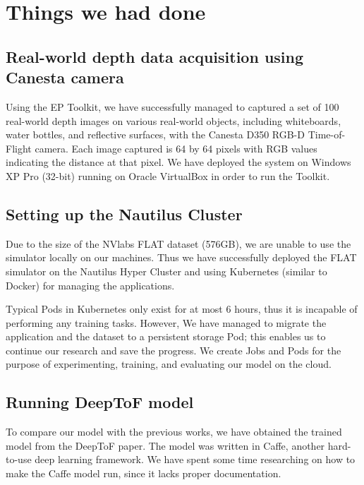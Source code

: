 \documentclass[runningheads]{llncs}
\begin{document}
\clearpage




\appendix
\appendixpage

\section{Things we had done}


\subsection{Real-world depth data acquisition using Canesta camera}

Using the EP Toolkit, we have successfully managed to captured a set of 100 real-world depth images on various real-world objects, including whiteboards, water bottles, and reflective surfaces, with the Canesta D350 RGB-D Time-of-Flight camera. 
Each image captured is 64 by 64 pixels with RGB values indicating the distance at that pixel.
We have deployed the system on Windows XP Pro (32-bit) running on Oracle VirtualBox in order to run the Toolkit.

\subsection{Setting up the Nautilus Cluster}

Due to the size of the NVlabs FLAT dataset (576GB), we are unable to use the simulator locally on our machines. 
Thus we have successfully deployed the FLAT simulator on the Nautilus Hyper Cluster and using Kubernetes (similar to Docker) for managing the applications. 

Typical Pods in Kubernetes only exist for at most 6 hours, thus it is incapable of performing any training tasks. However, We have managed to migrate the application and the dataset to a persistent storage Pod; this enables us to continue our research and save the progress. We create Jobs and Pods for the purpose of experimenting, training, and evaluating our model on the cloud.


\subsection{Running DeepToF model}

To compare our model with the previous works, we have obtained the trained model from the DeepToF paper. The model was written in Caffe, another hard-to-use deep learning framework. 
We have spent some time researching on how to make the Caffe model run, since it lacks proper documentation. 
\end{document}
